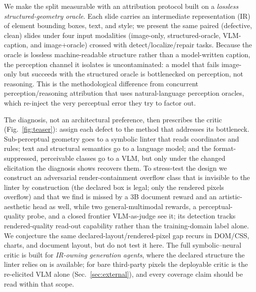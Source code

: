 \documentclass[10pt]{article}
\begin{document}
We make the split measurable with an attribution protocol built on a \emph{lossless structured-geometry
oracle}. Each slide carries an intermediate representation (IR) of element bounding boxes, text, and style; we
present the same paired (defective, clean) slides under four input modalities (image-only, structured-oracle,
VLM-caption, and image+oracle) crossed with detect/localize/repair tasks. Because the oracle is lossless
machine-readable structure rather than a model-written caption, the perception channel it isolates is
uncontaminated: a model that fails image-only but succeeds with the structured oracle is bottlenecked on
perception, not reasoning. This is the methodological difference from concurrent perception/reasoning
attribution that uses natural-language perception oracles, which re-inject the very perceptual error they try
to factor out.

The diagnosis, not an architectural preference, then prescribes the critic (Fig.~\ref{fig:teaser}): assign
each defect to the method that addresses its bottleneck. Sub-perceptual geometry goes to a symbolic linter that
reads coordinates and rules; text and structural semantics go to a language model; and the format-suppressed,
perceivable classes go to a VLM, but only under the changed elicitation the diagnosis shows recovers them. To
stress-test the design we construct an adversarial render-containment overflow class that is invisible
to the linter by construction (the declared box is legal; only the rendered pixels overflow) and that we find
is missed by a 3B document reward and an artistic-aesthetic head as well, while two general-multimodal
rewards, a perceptual-quality probe, and a closed frontier VLM-as-judge see it; its detection tracks
rendered-quality read-out capability rather than the training-domain label alone. We conjecture the same
declared-layout/rendered-pixel gap recurs in DOM/CSS, charts, and document layout, but do not test it here. The
full symbolic--neural critic is built for \emph{IR-owning generation agents}, where the declared structure the
linter relies on is available; for bare third-party pixels the deployable critic is the re-elicited VLM
alone (Sec.~\ref{sec:external}), and every coverage claim should be read within that scope.
\end{document}
